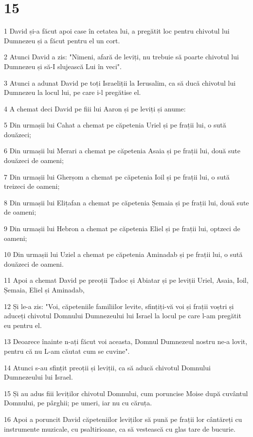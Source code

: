 \chapter{15}

\par 1 David și-a făcut apoi case în cetatea lui, a pregătit loc pentru chivotul lui Dumnezeu și a făcut pentru el un cort.
\par 2 Atunci David a zis: "Nimeni, afară de leviți, nu trebuie să poarte chivotul lui Dumnezeu și să-I slujească Lui în veci".
\par 3 Atunci a adunat David pe toți Israeliții la Ierusalim, ca să ducă chivotul lui Dumnezeu la locul lui, pe care i-l pregătise el.
\par 4 A chemat deci David pe fiii lui Aaron și pe leviți și anume:
\par 5 Din urmașii lui Cahat a chemat pe căpetenia Uriel și pe frații lui, o sută douăzeci;
\par 6 Din urmașii lui Merari a chemat pe căpetenia Asaia și pe frații lui, două sute douăzeci de oameni;
\par 7 Din urmașii lui Gherșom a chemat pe căpetenia Ioil și pe frații lui, o sută treizeci de oameni;
\par 8 Din urmașii lui Elițafan a chemat pe căpetenia Șemaia și pe frații lui, două sute de oameni;
\par 9 Din urmașii lui Hebron a chemat pe căpetenia Eliel și pe frații lui, optzeci de oameni;
\par 10 Din urmașii lui Uziel a chemat pe căpetenia Aminadab și pe frații lui, o sută douăzeci de oameni.
\par 11 Apoi a chemat David pe preoții Țadoc și Abiatar și pe leviții Uriel, Asaia, Ioil, Șemaia, Eliel și Aminadab,
\par 12 Și le-a zis: "Voi, căpeteniile familiilor levite, sfințiți-vă voi și frații voștri și aduceți chivotul Domnului Dumnezeului lui Israel la locul pe care l-am pregătit eu pentru el.
\par 13 Deoarece înainte n-ați făcut voi aceasta, Domnul Dumnezeul nostru ne-a lovit, pentru că nu L-am căutat cum se cuvine".
\par 14 Atunci s-au sfințit preoții și leviții, ca să aducă chivotul Domnului Dumnezeului lui Israel.
\par 15 Și au adus fiii leviților chivotul Domnului, cum poruncise Moise după cuvântul Domnului, pe pârghii; pe umeri, iar nu cu căruța.
\par 16 Apoi a poruncit David căpeteniilor leviților să pună pe frații lor cântăreți cu instrumente muzicale, cu psaltirioane, ca să vestească cu glas tare de bucurie.
